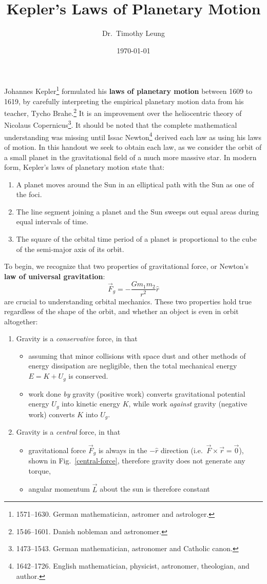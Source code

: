 \documentclass{../../../oss-handout}
\title{Kepler's Laws of Planetary Motion}
\author{Dr.\ Timothy Leung}
\date{\today}
\begin{document}
\thispagestyle{title}
\gentitle

Johannes Kepler\footnote{1571--1630. German mathematician, astromer and
  astrologer.} formulated his \textbf{laws of planetary motion}
between 1609 to 1619, by carefully interpreting the empirical planetary motion
data from his teacher, Tycho Brahe.\footnote{1546--1601. Danish nobleman and
  astronomer.} It is an improvement over the heliocentric
theory of Nicolaus Copernicus\footnote{1473--1543. German mathematician,
  astronomer and Catholic canon.}. It should be noted that the complete
mathematical understanding was missing until Issac Newton\footnote{1642--1726.
  English mathematician, physicist, astronomer, theologian, and author.}
derived each law as using his laws of motion. In this handout we seek to obtain
each law, as we consider the orbit of a small planet in the gravitational field
of a much more massive star. In modern form, Kepler's laws of planetary motion
state that:
\begin{enumerate}[nosep]
\item A planet moves around the Sun in an elliptical path with the Sun as one
  of the foci.
\item The line segment joining a planet and the Sun sweeps out equal areas
  during equal intervals of time.
\item The square of the orbital time period of a planet is proportional to the
  cube of the semi-major axis of its orbit.
\end{enumerate}
To begin, we recognize that two properties of gravitational force, or Newton's
\textbf{law of universal gravitation}:
\begin{equation}
  \vec F_g=-\frac{Gm_1m_2}{r^2}\hat r
\end{equation}
are crucial to
understanding orbital mechanics. These two properties hold true regardless
of the shape of the orbit, and whether an object is even in orbit altogether:
\begin{enumerate}[topsep=0pt]
\item Gravity is a \emph{conservative} force, in that
  \begin{itemize}[nosep]
  \item assuming that minor collisions with space dust and other methods of
    energy dissipation are negligible, then the total mechanical energy
    $E=K+U_g$ is conserved.
  \item work done \emph{by} gravity (positive work) converts gravitational
    potential energy $U_g$ into kinetic energy $K$, while work \emph{against}
    gravity (negative work) converts $K$ into $U_g$.
  \end{itemize}
\item Gravity is a \emph{central} force, in that
  \begin{itemize}[nosep]
  \item gravitational force $\vec F_g$ is always in the $-\hat r$ direction
    (i.e.\ $\vec F\times\vec r=\vec 0$), shown in
    Fig.~\ref{central-force}, therefore gravity does not generate any torque,
  \item angular momentum $\vec L$ about the sun is therefore constant
  \end{itemize}
\end{enumerate}
\end{document}
